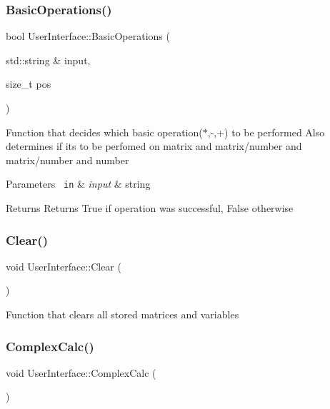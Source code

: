 \subsubsection{\texorpdfstring{BasicOperations()}{BasicOperations()}}
{\footnotesize\ttfamily bool User\+Interface\+::\+Basic\+Operations (\begin{DoxyParamCaption}\item[{std\+::string \&}]{input,  }\item[{size\+\_\+t}]{pos }\end{DoxyParamCaption})}

Function that decides which basic operation($\ast$,-\/,+) to be performed Also determines if it\textquotesingle{}s to be perfomed on matrix and matrix/number and matrix/number and number 
\begin{DoxyParams}[1]{Parameters}
\mbox{\texttt{ in}}  & {\em input} & string \\
\hline
\end{DoxyParams}
\begin{DoxyReturn}{Returns}
Returns True if operation was successful, False otherwise 
\end{DoxyReturn}
\mbox{\label{class_user_interface_a82de92f26f83e2ecaffa1c6ebd8accdb}} 
\subsubsection{\texorpdfstring{Clear()}{Clear()}}
{\footnotesize\ttfamily void User\+Interface\+::\+Clear (\begin{DoxyParamCaption}{ }\end{DoxyParamCaption})}

Function that clears all stored matrices and variables \mbox{\label{class_user_interface_a446c2436cb7b4743317307d9afc9b779}} 
\subsubsection{\texorpdfstring{ComplexCalc()}{ComplexCalc()}}
{\footnotesize\ttfamily void User\+Interface\+::\+Complex\+Calc (\begin{DoxyParamCaption}{ }\end{DoxyParamCaption})}

